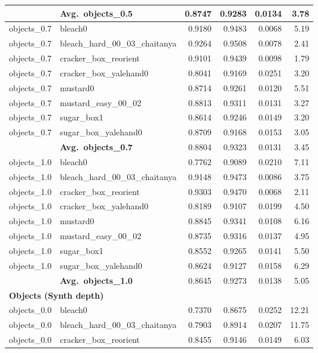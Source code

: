\begin{longtable}{llrrrr}
  & \textbf{Avg.~objects_0.5} & 0.8747 & 0.9283 & 0.0134 & 3.78 \\
  \midrule
  objects_0.7 & bleach0 & 0.9180 & 0.9483 & 0.0068 & 5.19 \\
  objects_0.7 & bleach\_hard\_00\_03\_chaitanya & 0.9264 & 0.9508 & 0.0078 & 2.41 \\
  objects_0.7 & cracker\_box\_reorient & 0.9101 & 0.9439 & 0.0098 & 1.79 \\
  objects_0.7 & cracker\_box\_yalehand0 & 0.8041 & 0.9169 & 0.0251 & 3.20 \\
  objects_0.7 & mustard0 & 0.8714 & 0.9261 & 0.0120 & 5.51 \\
  objects_0.7 & mustard\_easy\_00\_02 & 0.8813 & 0.9311 & 0.0131 & 3.27 \\
  objects_0.7 & sugar\_box1 & 0.8614 & 0.9246 & 0.0149 & 3.20 \\
  objects_0.7 & sugar\_box\_yalehand0 & 0.8709 & 0.9168 & 0.0153 & 3.05 \\
  \cmidrule{2-6}
  & \textbf{Avg.~objects_0.7} & 0.8804 & 0.9323 & 0.0131 & 3.45 \\
  \midrule
  objects_1.0 & bleach0 & 0.7762 & 0.9089 & 0.0210 & 7.11 \\
  objects_1.0 & bleach\_hard\_00\_03\_chaitanya & 0.9148 & 0.9473 & 0.0086 & 3.75 \\
  objects_1.0 & cracker\_box\_reorient & 0.9303 & 0.9470 & 0.0068 & 2.11 \\
  objects_1.0 & cracker\_box\_yalehand0 & 0.8189 & 0.9107 & 0.0199 & 4.50 \\
  objects_1.0 & mustard0 & 0.8845 & 0.9341 & 0.0108 & 6.16 \\
  objects_1.0 & mustard\_easy\_00\_02 & 0.8735 & 0.9316 & 0.0137 & 4.95 \\
  objects_1.0 & sugar\_box1 & 0.8552 & 0.9265 & 0.0141 & 5.50 \\
  objects_1.0 & sugar\_box\_yalehand0 & 0.8624 & 0.9127 & 0.0158 & 6.29 \\
  \cmidrule{2-6}
  & \textbf{Avg.~objects_1.0} & 0.8645 & 0.9273 & 0.0138 & 5.05 \\
  \midrule
\multicolumn{6}{l}{\textbf{Objects (Synth depth)}} \\
\midrule
  objects_0.0 & bleach0 & 0.7370 & 0.8675 & 0.0252 & 12.21 \\
  objects_0.0 & bleach\_hard\_00\_03\_chaitanya & 0.7903 & 0.8914 & 0.0207 & 11.75 \\
  objects_0.0 & cracker\_box\_reorient & 0.8455 & 0.9146 & 0.0149 & 6.03 \\

\end{longtable}
